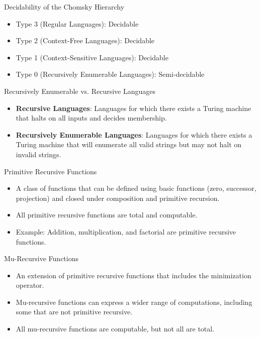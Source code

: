 \documentclass{beamer}
\begin{document}
\begin{frame}{Decidability of the Chomsky Hierarchy}
\begin{itemize}
    \item Type 3 (Regular Languages): Decidable
    \item Type 2 (Context-Free Languages): Decidable
    \item Type 1 (Context-Sensitive Languages): Decidable
    \item Type 0 (Recursively Enumerable Languages): Semi-decidable
\end{itemize}
\end{frame}

\begin{frame}{Recursively Enumerable vs. Recursive Languages}
\begin{itemize}
    \item \textbf{Recursive Languages}: Languages for which there exists a Turing machine that halts on all inputs and decides membership.
    \item \textbf{Recursively Enumerable Languages}: Languages for which there exists a Turing machine that will enumerate all valid strings but may not halt on invalid strings.
\end{itemize}
\end{frame}

\begin{frame}{Primitive Recursive Functions}
\begin{itemize}
    \item A class of functions that can be defined using basic functions (zero, successor, projection) and closed under composition and primitive recursion.
    \item All primitive recursive functions are total and computable.
    \item Example: Addition, multiplication, and factorial are primitive recursive functions.
\end{itemize}
\end{frame}

\begin{frame}{Mu-Recursive Functions}
\begin{itemize}
    \item An extension of primitive recursive functions that includes the minimization operator.
    \item Mu-recursive functions can express a wider range of computations, including some that are not primitive recursive.
    \item All mu-recursive functions are computable, but not all are total.
\end{itemize}
\end{frame}
\end{document}
